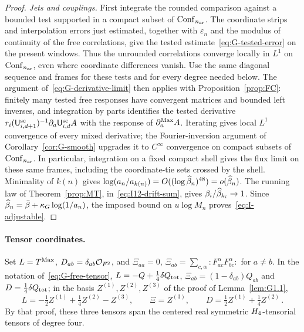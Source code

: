 \begin{proof}
\emph{Jets and couplings.} First integrate the rounded comparison against a bounded test supported in a compact subset of $\mathrm{Conf}_{n_{\rm ar}}$. The coordinate strips and interpolation errors just estimated, together with $\varepsilon_n$ and the modulus of continuity of the free correlations, give the tested estimate~\eqref{eq:G-tested-error} on the present windows. Thus the unrounded correlations converge locally in $L^1$ on $\mathrm{Conf}_{n_{\rm ar}}$, even where coordinate differences vanish. Use the same diagonal sequence and frames for these tests and for every degree needed below. The argument of~\eqref{eq:G-derivative-limit} then applies with Proposition~\ref{prop:FC}: finitely many tested free responses have convergent matrices and bounded left inverses, and integration by parts identifies the tested derivative $r_i(\mathsf{U}_{i,d+1}^{\mathrm{sc}})^{-1}\partial_a\mathsf{U}_{i,d}^{\mathrm{sc}}A$ with the response of $\partial_a^{\rm Max}A$. Iterating gives local $L^1$ convergence of every mixed derivative; the Fourier-inversion argument of Corollary~\ref{cor:G-smooth} upgrades it to $C^\infty$ convergence on compact subsets of $\mathrm{Conf}_{n_{\rm ar}}$. In particular, integration on a fixed compact shell gives the flux limit on these same frames, including the coordinate-tie sets crossed by the shell. Minimality of $k(n)$ gives $\log(a_n/a_{k(n)})=O((\log\widehat{\beta}_n)^{48})=o(\widehat{\beta}_n)$. The running law of Theorem~\ref{prop:MT}, in~\eqref{eq:I12-drift-sum}, gives $\beta_i/\widehat{\beta}_{k_i}\to1$. Since $\widehat{\beta}_n=\bar\beta+\kappa_G\log(1/a_n)$, the imposed bound on $u\log M_n$ proves~\eqref{eq:I-adjustable}.
\end{proof}

\paragraph{Tensor coordinates.}
Set $L=T^{\mathrm{Max}}$, $D_{ab}=\delta_{ab}\mathcal{O}_{F^2}$, and $\Xi_{aa}=0$, $\Xi_{ab}=\sum_{c,\alpha}:F_{ac}^\alpha F_{bc}^\alpha:$ for $a\ne b$. In the notation of~\eqref{eq:G-free-tensor}, $L=-Q+\tfrac14\delta Q_{\rm tot}$, $\Xi_{ab}=(1-\delta_{ab})Q_{ab}$ and $D=\tfrac14\delta Q_{\rm tot}$; in the basis $Z^{(1)},Z^{(2)},Z^{(3)}$ of the proof of Lemma~\ref{lem:G1.1},
\begin{equation*}
L=-\tfrac12Z^{(1)}+\tfrac14Z^{(2)}-Z^{(3)},\qquad\Xi=Z^{(3)},\qquad D=\tfrac12Z^{(1)}+\tfrac14Z^{(2)}\,.
\end{equation*}
By that proof, these three tensors span the centered real symmetric $H_4$-tensorial tensors of degree four.

